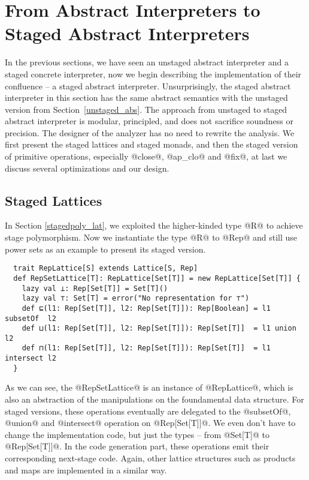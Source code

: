 \section{From Abstract Interpreters to Staged Abstract Interpreters} \label{sai}

In the previous sections, we have seen an unstaged abstract interpreter and a
staged concrete interpreter, now we begin describing the implementation of their
confluence -- a staged abstract interpreter.
Unsurprisingly, the staged abstract interpreter in this section has the same
abstract semantics with the unstaged version from Section~\ref{unstaged_abs}.
The approach from unstaged to staged abstract interpreter is modular,
principled, and does not sacrifice soundness or precision. The designer of the
analyzer has no need to rewrite the analysis. We first present the staged
lattices and staged monads, and then the staged version of primitive operations,
especially @close@, @ap_clo@ and @fix@, at last we discuss several optimizations
and our design.

\subsection{Staged Lattices}

In Section \ref{stagedpoly_lat}, we exploited the higher-kinded type @R@ to
achieve stage polymorphism. Now we instantiate the type @R@ to @Rep@ and
still use power sets as an example to present its staged version.

\begin{lstlisting}
  trait RepLattice[S] extends Lattice[S, Rep]
  def RepSetLattice[T]: RepLattice[Set[T]] = new RepLattice[Set[T]] {
    lazy val ⊥: Rep[Set[T]] = Set[T]()
    lazy val ⊤: Set[T] = error("No representation for ⊤")
    def ⊑(l1: Rep[Set[T]], l2: Rep[Set[T]]): Rep[Boolean] = l1 subsetOf  l2
    def ⊔(l1: Rep[Set[T]], l2: Rep[Set[T]]): Rep[Set[T]]  = l1 union     l2
    def ⊓(l1: Rep[Set[T]], l2: Rep[Set[T]]): Rep[Set[T]]  = l1 intersect l2
  }
\end{lstlisting}

As we can see, the @RepSetLattice@ is an instance of @RepLattice@, which is also
an abstraction of the manipulations on the foundamental data structure. For
staged versions, these operations eventually are delegated to the @subsetOf@,
@union@ and @intersect@ operation on @Rep[Set[T]]@. We even don't have to change
the implementation code, but just the types – from @Set[T]@ to @Rep[Set[T]]@. In
the code generation part, these operations emit their corresponding next-stage
code. Again, other lattice structures such as products and maps are implemented
in a similar way.

